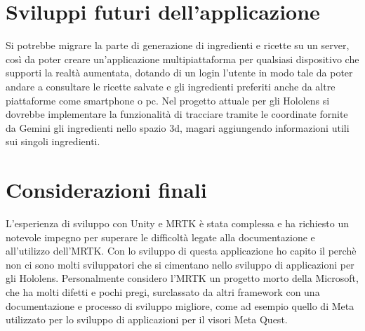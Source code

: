 \section{Sviluppi futuri dell'applicazione}
Si potrebbe migrare la parte di generazione di ingredienti e ricette su un server, così da poter creare un'applicazione multipiattaforma per qualsiasi dispositivo che supporti la realtà aumentata, dotando di un login l'utente in modo tale da poter andare a consultare le ricette salvate e gli ingredienti preferiti anche da altre piattaforme come smartphone o pc. Nel progetto attuale per gli Hololens si dovrebbe implementare la funzionalità di tracciare tramite le coordinate fornite da Gemini gli ingredienti nello spazio 3d, magari aggiungendo informazioni utili sui singoli ingredienti.

\section{Considerazioni finali}
L'esperienza di sviluppo con Unity e MRTK è stata complessa e ha richiesto un notevole impegno per superare le difficoltà legate alla documentazione e all'utilizzo dell'MRTK. Con lo sviluppo di questa applicazione ho capito il perchè non ci sono molti sviluppatori che si cimentano nello sviluppo di applicazioni per gli Hololens. Personalmente considero l'MRTK un progetto morto della Microsoft, che ha molti difetti e pochi pregi, surclassato da altri framework con una documentazione e processo di sviluppo migliore, come ad esempio quello di Meta utilizzato per lo sviluppo di applicazioni per il visori Meta Quest.